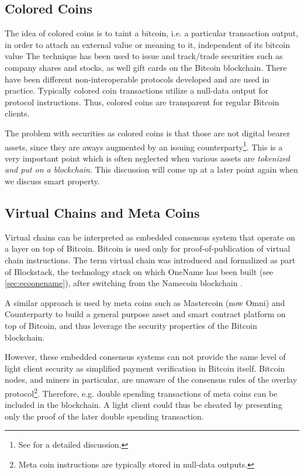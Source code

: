 \subsection{Colored Coins}
\label{sec:coloredcoins}

The idea of colored coins is to taint a bitcoin, i.e. a particular transaction output, in order to attach an external value or meaning to it, independent of its bitcoin value \parencite{coloredcoins} The technique has been used to issue and track/trade securities such as company shares and stocks, as well gift cards on the Bitcoin blockchain. There have been different non-interoperable protocols developed and are used in practice. Typically colored coin transactions utilize a null-data output for protocol instructions. Thus, colored coins are transparent for regular Bitcoin clients.

The problem with securities as colored coins is that those are not digital bearer assets, since they are aways augmented by an issuing counterparty\footnote{See \parencite{swanson2015} for a detailed discussion.}. This is a very important point which is often neglected when various assets are \emph{tokenized and put on a blockchain}. This discussion will come up at a later point again when we discuss smart property.

\subsection{Virtual Chains and Meta Coins}

Virtual chains can be interpreted as embedded consensus system that operate on a layer on top of Bitcoin. Bitcoin is used only for proof-of-publication of virtual chain instructions. The term virtual chain was introduced and formalized as part of Blockstack, the technology stack on which OneName has been built (see \ref{sec:ecoonename}), after switching from the Namecoin blockchain \parencite{ali2016blockstack}. 

A similar approach is used by meta coins such as Mastercoin (now Omni) and Counterparty to build a general purpose asset and smart contract platform on top of Bitcoin, and thus leverage the security properties of the Bitcoin blockchain. 

However, these embedded consensus systems can not provide the same level of light client security as simplified payment verification in Bitcoin itself. Bitcoin nodes, and miners in particular, are unaware of the consensus rules of the overlay protocol\footnote{Meta coin instructions are typically stored in null-data outputs.}. Therefore, e.g. double spending transactions of meta coins can be included in the blockchain. A light client could thus be cheated by presenting only the proof of the later double spending transaction.

